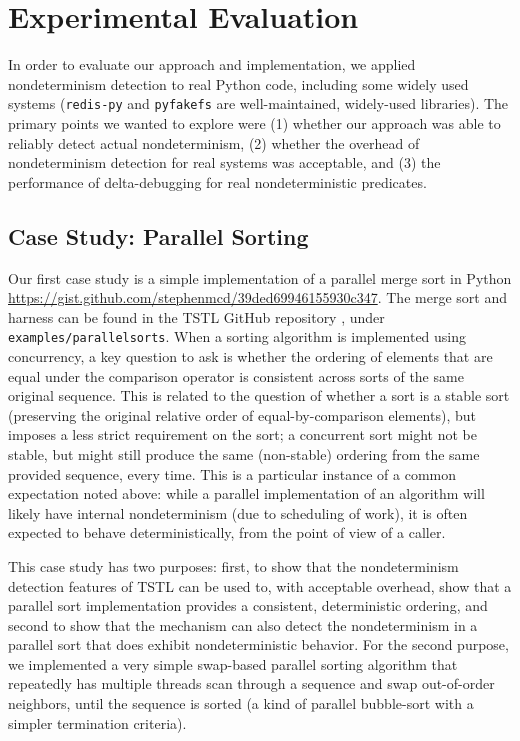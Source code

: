 \section{Experimental Evaluation}

In order to evaluate our approach and implementation, we applied
nondeterminism detection to real Python code, including some widely
used systems ({\tt redis-py} and {\tt pyfakefs} are well-maintained,
widely-used libraries).  The primary
points we wanted to explore were (1) whether our approach was able to reliably detect actual
nondeterminism, (2) whether the overhead of nondeterminism
detection for real systems was acceptable, and (3) the performance of
delta-debugging for real nondeterministic predicates.

\subsection{Case Study: Parallel Sorting}

Our first case study is a simple implementation of a parallel merge
sort in Python
\url{https://gist.github.com/stephenmcd/39ded69946155930c347}.  The
merge sort and harness can be found in the TSTL GitHub repository
\cite{tstl}, under {\tt examples/parallelsorts}.  When a sorting
algorithm is implemented using concurrency, a key question to ask is
whether the ordering of elements that are equal under the comparison
operator is consistent across sorts of the same original sequence.
This is related to the question of whether a sort is a stable sort
(preserving the original relative order of equal-by-comparison elements),
but imposes a less strict requirement on the sort; a concurrent sort
might not be stable, but might still produce the same (non-stable)
ordering from the same provided sequence, every time.  This is a
particular instance of a common expectation noted above:  while a parallel
implementation of an algorithm will likely have internal
nondeterminism (due to scheduling of work), it is often expected to
behave deterministically, from the point of view of a caller.

This case study has two purposes:  first, to show that the
nondeterminism detection features of TSTL can be used to, with
acceptable overhead, show that a parallel sort implementation provides
a consistent, deterministic ordering, and second to show that the
mechanism can also detect the nondeterminism in a parallel sort that
does exhibit nondeterministic behavior.  For the second purpose, we
implemented a very simple swap-based parallel sorting algorithm that
repeatedly has multiple threads scan through a sequence and swap
out-of-order neighbors, until the sequence is sorted (a kind of
parallel bubble-sort with a simpler termination criteria).

